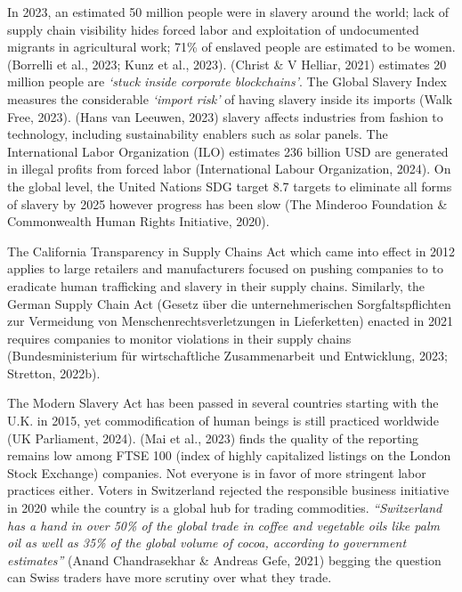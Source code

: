 \documentclass[
  12pt,
  letterpaper,
  DIV=11,
  numbers=noendperiod]{scrartcl}
\begin{document}
In 2023, an estimated 50 million people were in slavery around the
world; lack of supply chain visibility hides forced labor and
exploitation of undocumented migrants in agricultural work; 71\% of
enslaved people are estimated to be women. (Borrelli et al., 2023; Kunz
et al., 2023). (Christ \& V Helliar, 2021) estimates 20 million people
are \emph{`stuck inside corporate blockchains'}. The Global Slavery
Index measures the considerable \emph{`import risk'} of having slavery
inside its imports (Walk Free, 2023). (Hans van Leeuwen, 2023) slavery
affects industries from fashion to technology, including sustainability
enablers such as solar panels. The International Labor Organization
(ILO) estimates 236 billion USD are generated in illegal profits from
forced labor (International Labour Organization, 2024). On the global
level, the United Nations SDG target 8.7 targets to eliminate all forms
of slavery by 2025 however progress has been slow (The Minderoo
Foundation \& Commonwealth Human Rights Initiative, 2020).

The California Transparency in Supply Chains Act which came into effect
in 2012 applies to large retailers and manufacturers focused on pushing
companies to to eradicate human trafficking and slavery in their supply
chains. Similarly, the German Supply Chain Act (Gesetz über die
unternehmerischen Sorgfaltspflichten zur Vermeidung von
Menschenrechtsverletzungen in Lieferketten) enacted in 2021 requires
companies to monitor violations in their supply chains
(Bundesministerium für wirtschaftliche Zusammenarbeit und Entwicklung,
2023; Stretton, 2022b).

The Modern Slavery Act has been passed in several countries starting
with the U.K. in 2015, yet commodification of human beings is still
practiced worldwide (UK Parliament, 2024). (Mai et al., 2023) finds the
quality of the reporting remains low among FTSE 100 (index of highly
capitalized listings on the London Stock Exchange) companies. Not
everyone is in favor of more stringent labor practices either. Voters in
Switzerland rejected the responsible business initiative in 2020 while
the country is a global hub for trading commodities. \emph{``Switzerland
has a hand in over 50\% of the global trade in coffee and vegetable oils
like palm oil as well as 35\% of the global volume of cocoa, according
to government estimates''} (Anand Chandrasekhar \& Andreas Gefe, 2021)
begging the question can Swiss traders have more scrutiny over what they
trade.
\end{document}
